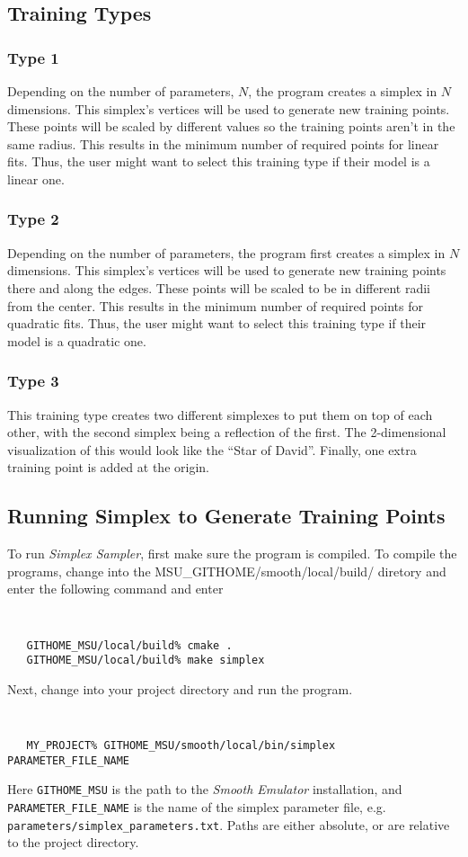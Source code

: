 \documentclass[UserManual.tex]{subfiles}
\begin{document}
\subsection{Training Types}

\subsubsection{Type 1}
 Depending on the number of parameters, $N$, the program creates a simplex in $N$ dimensions. This simplex's vertices will be used to generate new training points. These points will be scaled by different values so the training points aren't in the same radius. This results in the minimum number of required points for linear fits. Thus, the user might want to select this training type if their model is a linear one. 

\subsubsection{Type 2}

 Depending on the number of parameters, the program first creates a simplex in $N$ dimensions. This simplex's vertices will be used to generate new training points there and along the edges. These points will be scaled to be in different radii from the center. This results in the minimum number of required points for quadratic fits. Thus, the user might want to select this training type if their model is a quadratic one.
 
\subsubsection{Type 3}
This training type creates two different simplexes to put them on top of each other, with the second simplex being a reflection of the first. The 2-dimensional visualization of this would look like the ``Star of David''.  Finally, one extra training point is added at the origin.

\subsection{Running Simplex to Generate Training Points}

To run {\it Simplex Sampler}, first make sure the program is compiled. To compile the programs, change into the {MSU\_GITHOME/smooth/local/build/} diretory and enter the following command and enter
{\tt
\begin{verbatim}
   GITHOME_MSU/local/build% cmake .
   GITHOME_MSU/local/build% make simplex
\end{verbatim}
}
Next, change into your project directory and run the program.
{\tt
\begin{verbatim}
   MY_PROJECT% GITHOME_MSU/smooth/local/bin/simplex PARAMETER_FILE_NAME
\end{verbatim}
}
Here {\tt GITHOME\_MSU} is the path to the {\it Smooth Emulator} installation, and {\tt PARAMETER\_FILE\_NAME} is the name of the simplex parameter file, e.g. {\tt parameters/simplex\_parameters.txt}. Paths are either absolute, or are relative to the project directory. 
\end{document}

